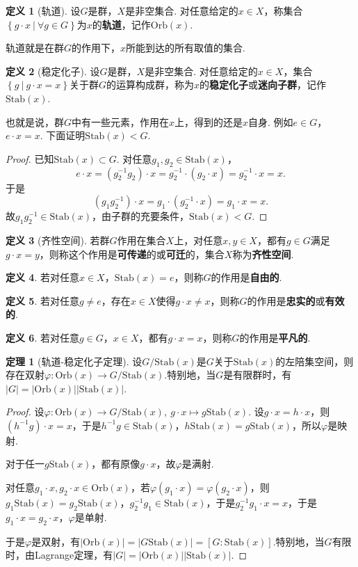 \documentclass[12pt]{ctexart}
\theoremstyle{definition}
\newtheorem{definition}{定义}
\newtheorem{theorem}{定理}
\theoremstyle{plain}
\newcommand{\Orb}{\mathrm{Orb}}
\newcommand{\Stab}{\mathrm{Stab}}
\begin{document}
	\begin{definition}[轨道]
		设$G$是群，$X$是非空集合. 对任意给定的$x\in X$，称集合$\left\{g\cdot x\ |\ \forall g\in G\right\}$为$x$的\textbf{轨道}，记作$\Orb(x)$.
	\end{definition}
	轨道就是在群$G$的作用下，$x$所能到达的所有取值的集合.
	\begin{definition}[稳定化子]
		设$G$是群，$X$是非空集合. 对任意给定的$x\in X$，集合$\left\{g\ |\ g\cdot x=x\right\}$关于群$G$的运算构成群，称为$x$的\textbf{稳定化子}或\textbf{迷向子群}，记作$\Stab(x)$.
	\end{definition}
	也就是说，群$G$中有一些元素，作用在$x$上，得到的还是$x$自身. 例如$e\in G$，$e\cdot x=x$. 下面证明$\Stab(x)<G$.
	\begin{proof}
		已知$\Stab(x)\subset G$. 对任意$g_1,g_2\in \Stab(x)$，
		$$e\cdot x=(g_2^{-1}g_2)\cdot x=g_2^{-1}\cdot(g_2\cdot x)=g_2^{-1}\cdot x=x.$$
		于是
		$$(g_1g_2^{-1})\cdot x=g_1\cdot (g_2^{-1}\cdot x)=g_1\cdot x=x.$$
		故$g_1g_2^{-1}\in \Stab(x)$，由子群的充要条件，$\Stab(x)<G$.
	\end{proof}
	\begin{definition}[齐性空间]
		若群$G$作用在集合$X$上，对任意$x,y\in X$，都有$g\in G$满足$g\cdot x=y$，则称这个作用是\textbf{可传递}的或\textbf{可迁}的，集合$X$称为\textbf{齐性空间}.
	\end{definition}
	\begin{definition}
		若对任意$x\in X$，$\Stab(x)=e$，则称$G$的作用是\textbf{自由的}.
	\end{definition}
	\begin{definition}
		若对任意$g\neq e$，存在$x\in X$使得$g\cdot x\neq x$，则称$G$的作用是\textbf{忠实的}或\textbf{有效的}.
	\end{definition}
	\begin{definition}
		若对任意$g\in G$，$x\in X$，都有$g\cdot x=x$，则称$G$的作用是\textbf{平凡的}.
	\end{definition}
	\begin{theorem}[轨道-稳定化子定理]
		设$G/\Stab(x)$是$G$关于$\Stab(x)$的左陪集空间，则存在双射$\varphi:\Orb(x)\to G/\Stab(x)$.特别地，当$G$是有限群时，有$|G|=|\Orb(x)||\Stab(x)|$.
	\end{theorem}
	\begin{proof}
		设$\varphi:\Orb(x)\to G/\Stab(x),\ g\cdot x\mapsto g\Stab(x)$. 设$g\cdot x=h\cdot x$，则$(h^{-1}g)\cdot x=x$，于是$h^{-1}g\in\Stab(x)$，$h\Stab(x)=g\Stab(x)$，所以$\varphi$是映射.
		
		对于任一$g\Stab(x)$，都有原像$g\cdot x$，故$\varphi$是满射.
		
		对任意$g_1\cdot x,g_2\cdot x\in\Orb(x)$，若$\varphi(g_1\cdot x)=\varphi(g_2\cdot x)$，则$g_1\Stab(x)=g_2\Stab(x)$，$g_2^{-1}g_1\in\Stab(x)$，于是$g_2^{-1}g_1\cdot x=x$，于是$g_1\cdot x=g_2\cdot x$，$\varphi$是单射.
		
		于是$\varphi$是双射，有$|\Orb(x)|=|G\Stab(x)|=\left[G:\Stab(x)\right]$.特别地，当$G$有限时，由Lagrange定理，有$|G|=|\Orb(x)||\Stab(x)|$.
	\end{proof}
\end{document}
